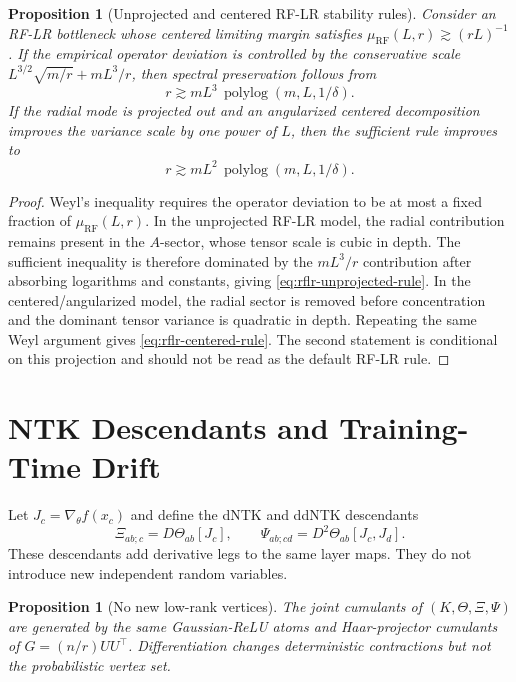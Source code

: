 \documentclass{article}
\newtheorem{proposition}[theorem]{Proposition}
\begin{document}
\begin{proposition}[Unprojected and centered RF-LR stability rules]
\label{prop:rflr-rules}
Consider an RF-LR bottleneck whose centered limiting margin satisfies
\(\mu_{\mathrm{RF}}(L,r)\gtrsim (rL)^{-1}\). If the empirical operator deviation is controlled by the conservative scale \(L^{3/2}\sqrt{m/r}+mL^3/r\), then spectral preservation follows from
\begin{equation}
r\gtrsim mL^3\,\operatorname{polylog}(m,L,1/\delta).
\label{eq:rflr-unprojected-rule}
\end{equation}
If the radial mode is projected out and an angularized centered decomposition improves the variance scale by one power of \(L\), then the sufficient rule improves to
\begin{equation}
r\gtrsim mL^2\,\operatorname{polylog}(m,L,1/\delta).
\label{eq:rflr-centered-rule}
\end{equation}
\end{proposition}

\begin{proof}
Weyl's inequality requires the operator deviation to be at most a fixed fraction of \(\mu_{\mathrm{RF}}(L,r)\). In the unprojected RF-LR model, the radial contribution remains present in the \(A\)-sector, whose tensor scale is cubic in depth. The sufficient inequality is therefore dominated by the \(mL^3/r\) contribution after absorbing logarithms and constants, giving \eqref{eq:rflr-unprojected-rule}. In the centered/angularized model, the radial sector is removed before concentration and the dominant tensor variance is quadratic in depth. Repeating the same Weyl argument gives \eqref{eq:rflr-centered-rule}. The second statement is conditional on this projection and should not be read as the default RF-LR rule.
\end{proof}

\section{NTK Descendants and Training-Time Drift}
Let \(J_c=\nabla_\theta f(x_c)\) and define the dNTK and ddNTK descendants
\begin{equation}
\Xi_{ab;c}=D\Theta_{ab}[J_c],
\qquad
\Psi_{ab;cd}=D^2\Theta_{ab}[J_c,J_d].
\end{equation}
These descendants add derivative legs to the same layer maps. They do not introduce new independent random variables.

\begin{proposition}[No new low-rank vertices]
\label{prop:no-new-vertices}
The joint cumulants of \((K,\Theta,\Xi,\Psi)\) are generated by the same Gaussian-ReLU atoms and Haar-projector cumulants of \(G=(n/r)UU^\top\). Differentiation changes deterministic contractions but not the probabilistic vertex set.
\end{proposition}
\end{document}

